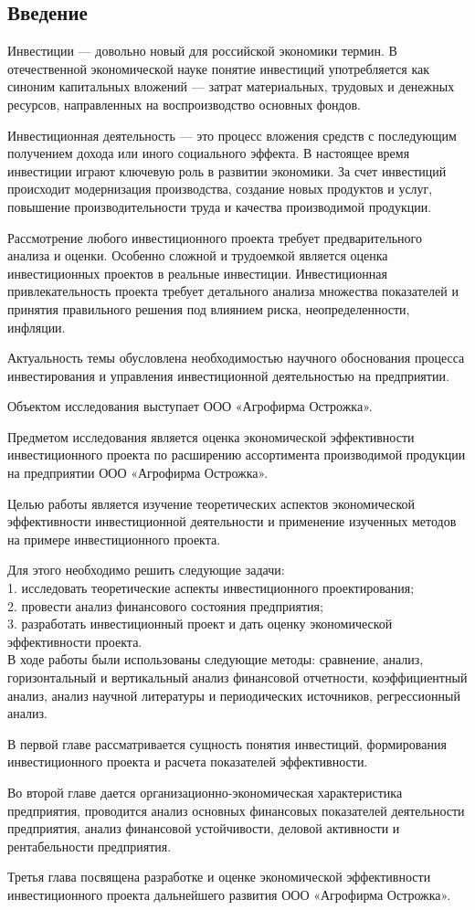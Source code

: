 \subsection*{Введение}
Инвестиции --- довольно новый для российской экономики термин. В отечественной экономической науке понятие инвестиций употребляется как синоним капитальных вложений --- затрат материальных, трудовых и денежных ресурсов, направленных на воспроизводство основных фондов.

Инвестиционная деятельность --- это процесс вложения средств с последующим получением дохода или иного социального эффекта. В настоящее время инвестиции играют ключевую роль в развитии экономики. За счет инвестиций происходит модернизация производства, создание новых продуктов и услуг, повышение производительности труда и качества производимой продукции.

Рассмотрение любого инвестиционного проекта требует предварительного анализа и оценки. Особенно сложной и трудоемкой является оценка инвестиционных проектов в реальные инвестиции. Инвестиционная привлекательность проекта требует детального анализа множества показателей и принятия правильного решения под влиянием риска, неопределенности, инфляции.

Актуальность темы обусловлена необходимостью научного обоснования процесса инвестирования и управления инвестиционной деятельностью на предприятии.

Объектом исследования выступает ООО «Агрофирма Острожка».

Предметом исследования является оценка экономической эффективности инвестиционного проекта по расширению ассортимента производимой продукции на предприятии ООО «Агрофирма Острожка».

Целью работы является изучение теоретических аспектов экономической эффективности инвестиционной деятельности и применение изученных методов на примере инвестиционного проекта.

Для этого необходимо решить следующие задачи:\\
1. исследовать теоретические аспекты инвестиционного проектирования;\\
2. провести анализ финансового состояния предприятия;\\
3. разработать инвестиционный проект и дать оценку экономической эффективности проекта.\\

В ходе работы были использованы следующие методы: сравнение, анализ, горизонтальный и вертикальный анализ финансовой отчетности, коэффициентный анализ, анализ научной литературы и периодических источников, регрессионный анализ.

В первой главе рассматривается сущность понятия инвестиций, формирования инвестиционного проекта и расчета показателей эффективности.

Во второй главе дается организационно-экономическая характеристика предприятия, проводится анализ основных финансовых показателей деятельности предприятия, анализ финансовой устойчивости, деловой активности и рентабельности предприятия.

Третья глава посвящена разработке и оценке экономической эффективности инвестиционного проекта дальнейшего развития ООО «Агрофирма Острожка».
